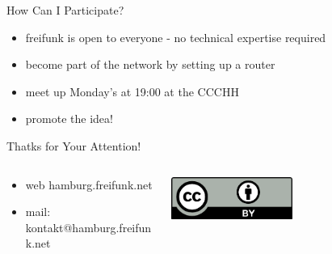 \documentclass[c]{beamer}
\begin{document}
\begin{frame}{How Can I Participate?}
	\begin{itemize}
		\item freifunk is open to everyone - no technical expertise required
		\item become part of the network by setting up a router
		\item meet up Monday's at 19:00 at the CCCHH
		\item promote the idea!
	\end{itemize}
\end{frame}


\begin{frame}{Thatks for Your Attention!}
	\begin{columns}
		\begin{column}{0.6\textwidth}
			\begin{itemize}
				\item web hamburg.freifunk.net
				\item mail: kontakt@hamburg.freifunk.net
		\end{itemize}
		\end{column}
		\begin{column}{0.5\textwidth}
			\begin{center}
				\includegraphics[width=0.5\textwidth]{Bilder/cc-by}
			\end{center}
		\end{column}
	\end{columns}
\end{frame}
\end{document}
